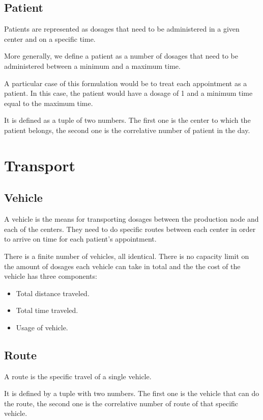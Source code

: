 \subsection{Patient}

Patients are represented as dosages that need to be administered in a given center and on a specific time.

More generally, we define a patient as a number of dosages that need to be administered between a minimum and a maximum time. 

A particular case of this formulation would be to treat each appointment as a patient. In this case, the patient would have a dosage of 1 and a minimum time equal to the maximum time.

It is defined as a tuple of two numbers. The first one is the center to which the patient belongs, the second one is the correlative number of patient in the day.

\section{Transport}

\subsection{Vehicle}

A vehicle is the means for transporting dosages between the production node and each of the centers. They need to do specific routes between each center in order to arrive on time for each patient's appointment.

There is a finite number of vehicles, all identical. There is no capacity limit on the amount of dosages each vehicle can take in total and the the cost of the vehicle has three components:

\begin{itemize}
	\item Total distance traveled.
	\item Total time traveled.
	\item Usage of vehicle.
\end{itemize}

\subsection{Route}
\label{def:route}

A route is the specific travel of a single vehicle.

It is defined by a tuple with two numbers. The first one is the vehicle that can do the route, the second one is the correlative number of route of that specific vehicle.

